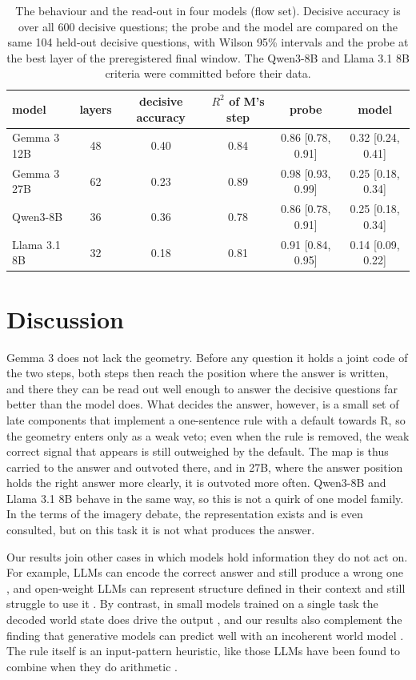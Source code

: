 \documentclass[10pt]{article}
\begin{document}
\begin{table}[t]
  \centering
  \small
  \caption{The behaviour and the read-out in four models (flow set). Decisive accuracy is over all 600 decisive
  questions; the probe and the model are compared on the same 104 held-out decisive questions, with Wilson 95\%
  intervals and the probe at the best layer of the preregistered final window. The Qwen3-8B and Llama 3.1 8B criteria
  were committed before their data.}
  \label{tab:families}
  \begin{tabular}{@{}lccccc@{}}
    \toprule
    model & layers & decisive accuracy & $R^2$ of M's step & probe & model \\
    \midrule
    Gemma 3 12B & 48 & 0.40 & 0.84 & 0.86 [0.78, 0.91] & 0.32 [0.24, 0.41] \\
    Gemma 3 27B & 62 & 0.23 & 0.89 & 0.98 [0.93, 0.99] & 0.25 [0.18, 0.34] \\
    Qwen3-8B & 36 & 0.36 & 0.78 & 0.86 [0.78, 0.91] & 0.25 [0.18, 0.34] \\
    Llama 3.1 8B & 32 & 0.18 & 0.81 & 0.91 [0.84, 0.95] & 0.14 [0.09, 0.22] \\
    \bottomrule
  \end{tabular}
\end{table}

\section{Discussion}
Gemma 3 does not lack the geometry. Before any question it holds a joint code of the two steps, both steps then
reach the position where the answer is written, and there they can be read out well enough to answer the decisive
questions far better than the model does. What decides the answer, however, is a small set of late components that
implement a one-sentence rule with a default towards R, so the geometry enters only as a weak veto; even when the rule
is removed, the weak correct signal that appears is still outweighed by the default. The map is thus carried to the
answer and outvoted there, and in 27B, where the answer position holds the right answer more clearly, it is outvoted
more often. Qwen3-8B and Llama 3.1 8B behave in the same way, so this is not a quirk of one model
family. In the terms of the imagery debate, the representation exists and is even consulted, but on this task it
is not what produces the answer.

Our results join other cases in which models hold information they do not act on. For example, LLMs can encode the correct answer
and still produce a wrong one \citep{orgad2025know}, and open-weight LLMs can represent structure defined in their
context and still struggle to use it \citep{lepori2026incontext}. By contrast, in small models trained on a single
task the decoded world state does drive the output \citep{li2023othello,nanda2023linear}, and our results also
complement the finding that generative models can predict well with an incoherent world model \citep{vafa2024world}.
The rule itself is an input-pattern heuristic, like those LLMs have been found to combine when they do arithmetic
\citep{nikankin2025heuristics}.
\end{document}
